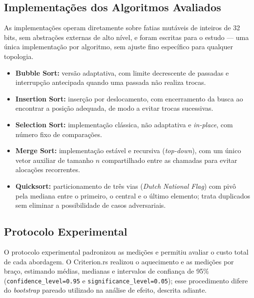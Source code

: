 \documentclass[12pt]{article}
\begin{document}
\subsection{Implementações dos Algoritmos Avaliados}\label{sec:impl}

As implementações operam diretamente sobre fatias mutáveis de inteiros de 32 bits, sem abstrações externas de alto nível, e foram escritas para o estudo --- uma única implementação por algoritmo, sem ajuste fino específico para qualquer topologia.

\begin{itemize}
    \item \textbf{Bubble Sort:} versão adaptativa, com limite decrescente de passadas e interrupção antecipada quando uma passada não realiza trocas.

    \item \textbf{Insertion Sort:} inserção por deslocamento, com encerramento da busca ao encontrar a posição adequada, de modo a evitar trocas sucessivas.

    \item \textbf{Selection Sort:} implementação clássica, não adaptativa e \emph{in-place}, com número fixo de comparações.

    \item \textbf{Merge Sort:} implementação estável e recursiva (\emph{top-down}), com um único vetor auxiliar de tamanho $n$ compartilhado entre as chamadas para evitar alocações recorrentes.

    \item \textbf{Quicksort:} particionamento de três vias (\emph{Dutch National Flag}) com pivô pela mediana entre o primeiro, o central e o último elemento; trata duplicados sem eliminar a possibilidade de casos adversariais.
\end{itemize}

\subsection{Protocolo Experimental}\label{sec:protocolo}

O protocolo experimental padronizou as medições e permitiu avaliar o custo total de cada abordagem. O Criterion.rs realizou o aquecimento e as medições por braço, estimando médias, medianas e intervalos de confiança de 95\% (\texttt{confidence\_level=0.95} e \texttt{significance\_level=0.05}); esse procedimento difere do \emph{bootstrap} pareado utilizado na análise de efeito, descrita adiante.
\end{document}
